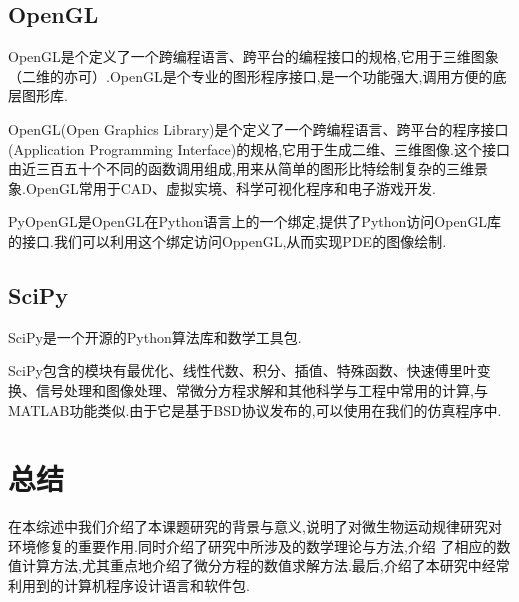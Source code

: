 \documentclass[a4paper,cs4size,adobefonts,fancyhdr]{ctexart}[2005/11/25]
\newcommand{\upcite}[1]{\textsuperscript{\textsuperscript{\cite{#1}}}}
\begin{document}
\subsection{OpenGL}
OpenGL\upcite{王玉珉2004}是个定义了一个跨编程语言、跨平台的编程接口的规格,它用于三维图象（二维的亦可）.OpenGL是个专业的图形程序接口,是一个功能强大,调用方便的底层图形库.\par
OpenGL(Open Graphics Library)是个定义了一个跨编程语言、跨平台的程序接口(Application Programming Interface)的规格,它用于生成二维、三维图像.这个接口由近三百五十个不同的函数调用组成,用来从简单的图形比特绘制复杂的三维景象.OpenGL常用于CAD、虚拟实境、科学可视化程序和电子游戏开发.\par
PyOpenGL是OpenGL在Python语言上的一个绑定,提供了Python访问OpenGL库的接口.我们可以利用这个绑定访问OppenGL,从而实现PDE的图像绘制.
\subsection{SciPy}
SciPy\upcite{袁光伟2013}是一个开源的Python算法库和数学工具包.\par
SciPy包含的模块有最优化、线性代数、积分、插值、特殊函数、快速傅里叶变换、信号处理和图像处理、常微分方程求解和其他科学与工程中常用的计算,与MATLAB功能类似.由于它是基于BSD协议发布的,可以使用在我们的仿真程序中.
\section{总结}
在本综述中我们介绍了本课题研究的背景与意义,说明了对微生物运动规律研究对环境修复的重要作用.同时介绍了研究中所涉及的数学理论与方法,介绍
了相应的数值计算方法,尤其重点地介绍了微分方程的数值求解方法.最后,介绍了本研究中经常利用到的计算机程序设计语言和软件包.
\end{document}
